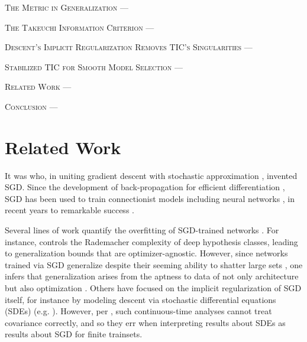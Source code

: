 \documentclass{article}
\begin{document}
    \textsc{The Metric in Generalization} ---
    
    \textsc{The Takeuchi Information Criterion} ---
    
    \textsc{Descent's Implicit Regularization Removes TIC's Singularities} ---
    
    \textsc{Stabilized TIC for Smooth Model Selection} ---

    \textsc{Related Work} ---

    \textsc{Conclusion} ---


\section{Related Work}


    It was \citet{ki52} who, in uniting gradient descent \citep{ca47} with
    stochastic approximation \citep{ro51}, invented SGD.  Since the development
    of back-propagation for efficient differentiation \citep{we74}, SGD
    has been used to train connectionist models including neural
    networks \citep{bo91}, in recent years to remarkable success \citep{le15}.


    Several lines of work quantify the overfitting of SGD-trained networks
    \citep{ne17a}.  For instance, \citet{ba17} controls the Rademacher
    complexity of deep hypothesis classes, leading to generalization bounds
    that are optimizer-agnostic.  However, since networks trained via SGD
    generalize despite their seeming ability to shatter large sets
    \citep{zh17}, one infers that generalization arises from the aptness to
    data of not only architecture but also optimization \citep{ne17b}.  Others
    have focused on the implicit regularization of SGD itself, for instance by
    modeling descent via stochastic differential equations (SDEs) (e.g.
    \citet{ch18}).  However, per \citet{ya19}, such continuous-time analyses
    cannot treat covariance correctly, and so they err when interpreting
    results about SDEs as results about SGD for finite trainsets.
\end{document}
